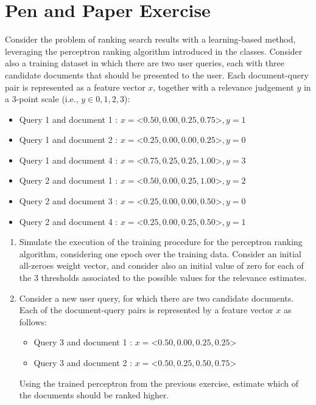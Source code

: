 \documentclass[12pt]{article}
\begin{document}
\section{Pen and Paper Exercise}

Consider the problem of ranking search results with a learning-based method, leveraging the perceptron ranking algorithm introduced in the classes. Consider also a training dataset in which there are two user queries, each with three candidate documents that should be presented to the user. Each document-query pair is represented as a feature vector $x$, together with a relevance judgement $y$ in a 3-point scale (i.e., $y \in {0,1,2,3}$):

\begin{itemize}
\item Query 1 and document 1 : $x=$<$0.50, 0.00, 0.25, 0.75$>$ , y=1$
\item Query 1 and document 2 : $x=$<$0.25, 0.00, 0.00, 0.25$>$ , y=0$
\item Query 1 and document 4 : $x=$<$0.75, 0.25, 0.25, 1.00$>$ , y=3$

\item Query 2 and document 1 : $x=$<$0.50, 0.00, 0.25, 1.00$>$ , y=2$
\item Query 2 and document 3 : $x=$<$0.25, 0.00, 0.00, 0.50$>$ , y=0$
\item Query 2 and document 4 : $x=$<$0.25, 0.00, 0.25, 0.50$>$ , y=1$
\end{itemize}

\begin{enumerate}
\item Simulate the execution of the training procedure for the perceptron ranking algorithm, considering one epoch over the training data. Consider an initial all-zeroes weight vector, and consider also an initial value of zero for each of the 3 thresholds associated to the possible values for the relevance estimates.

\item Consider a new user query, for which there are two candidate documents. Each of the document-query pairs is represented by a feature vector $x$ as follows:

\begin{itemize}
\item Query 3 and document 1 : $x=$<$0.50, 0.00, 0.25, 0.25$>
\item Query 3 and document 2 : $x=$<$0.50, 0.25, 0.50, 0.75$>
\end{itemize}

Using the trained perceptron from the previous exercise, estimate which of the documents should be ranked higher.
\end{enumerate}
\end{document}
